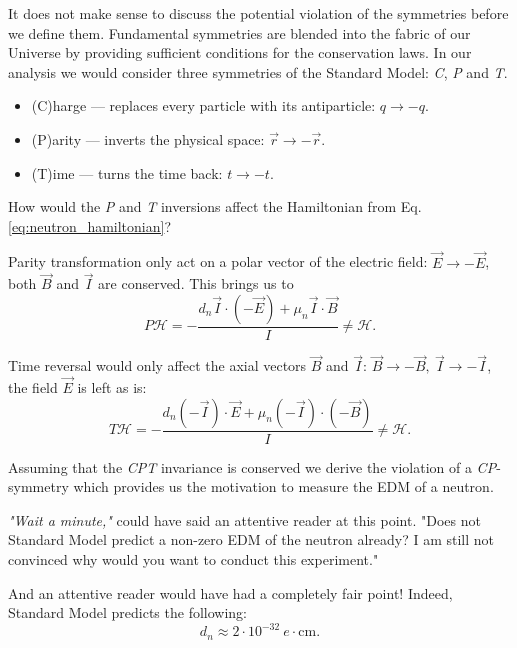 It does not make sense to discuss the potential violation of the symmetries before we define them.  Fundamental symmetries are blended into the fabric of our Universe by providing sufficient conditions \cite{Noether1918} for the conservation laws. In our analysis we would consider three symmetries of the Standard Model: \textit{C}, \textit{P} and \textit{T}.

\begin{itemize}
	\item (C)harge –-- replaces every particle with its antiparticle: $q \rightarrow -q$.
	\item (P)arity --- inverts the physical space: $\vec{r} \rightarrow -\vec{r}$.
	\item (T)ime --- turns the time back: $t \rightarrow -t$.
\end{itemize}

How would the \textit{P} and \textit{T} inversions affect \cite{Dubbers2011} the Hamiltonian from Eq. \ref{eq:neutron_hamiltonian}?

Parity transformation only act on a polar vector of the electric field: $\vec{E} \rightarrow -\vec{E}$, both $\vec{B}$ and $\vec{I}$ are conserved. This brings us to
\begin{equation}
	\textit{P}\mathcal{H} = -\frac{d_n \vec{I} \cdot \left(-\vec{E}\right) + \mu_n \vec{I} \cdot \vec{B}}{I} \neq \mathcal{H}.
	\label{eq:neutron_hamiltonian_P}
\end{equation}

Time reversal would only affect the axial vectors $\vec{B}$ and $\vec{I}$: $\vec{B} \rightarrow -\vec{B},\ \vec{I} \rightarrow -\vec{I}$, the field $\vec{E}$ is left as is:
\begin{equation}
	\textit{T}\mathcal{H} = -\frac{d_n \left(-\vec{I}\right) \cdot \vec{E} + \mu_n \left(-\vec{I}\right) \cdot \left( -\vec{B} \right)}{I} \neq \mathcal{H}.
	\label{eq:neutron_hamiltonian_T}
\end{equation}

Assuming that the \textit{CPT} invariance \cite{Schwinger1951} is conserved we derive the violation of a \textit{CP}-symmetry which provides us the motivation to measure the EDM of a neutron.

\textit{"Wait a minute,"} could have said an attentive reader at this point. "Does not Standard Model predict a non-zero EDM of the neutron already? I am still not convinced why would you want to conduct this experiment."

And an attentive reader would have had a completely fair point! Indeed, Standard Model predicts \cite{Khriplovich1982} the following:
\begin{equation}
	d_n \approx 2 \cdot 10^{-32}\ e \cdot \text{cm}.
\end{equation}

